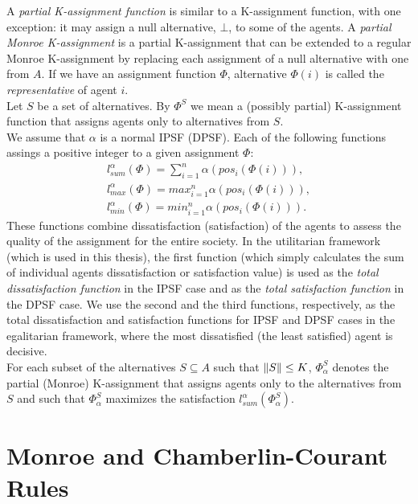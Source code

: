 A \textit{partial K-assignment function} is similar to a K-assignment function, with one exception: it may assign a null alternative, $\bot$, to some of the agents. A \textit{partial Monroe K-assignment} is a partial K-assignment that can be extended to a regular Monroe K-assignment by replacing each assignment of a null alternative with one from $A$. If we have an assignment function $\Phi$, alternative $\Phi(i)$ is called the \textit{representative} of agent $i$.
\\

Let $S$ be a set of alternatives. By $\Phi^{S}$ we mean a (possibly partial) K-assignment function that assigns agents only to alternatives from $S$.
\\

We assume that $\alpha$ is a normal IPSF (DPSF). Each of the following functions assings a positive integer to a given assignment $\Phi$:
\begin{gather}
	l^{\alpha}_{sum}(\Phi) = \sum^{n}_{i=1} \alpha (pos_{i}(\Phi(i))),\\
	l^{\alpha}_{max}(\Phi) = max^{n}_{i=1} \alpha (pos_{i}(\Phi(i))),\\
	l^{\alpha}_{min}(\Phi) = min^{n}_{i=1} \alpha (pos_{i}(\Phi(i))).
\end{gather}
These functions combine dissatisfaction (satisfaction) of the agents to assess the quality of the assignment for the entire society. In the utilitarian framework (which is used in this thesis), the first function (which simply calculates the sum of individual agents dissatisfaction or satisfaction value) is used as the \textit{total dissatisfaction function} in the IPSF case and as the \textit{total satisfaction function} in the DPSF case. We use the second and the third functions, respectively, as the total dissatisfaction and satisfaction functions for IPSF and DPSF cases in the egalitarian framework, where the most dissatisfied (the least satisfied) agent is decisive.
\\

For each subset of the alternatives $S \subseteq A$ such that $\lVert S\rVert \leq K$, $\Phi^{S}_{\alpha}$ denotes the partial (Monroe) K-assignment that assigns agents only to the alternatives from $S$ and such that $\Phi^{S}_{\alpha}$ maximizes the satisfaction $l^{\alpha}_{sum}(\Phi^{S}_{\alpha})$.

\section{Monroe and Chamberlin-Courant Rules}


